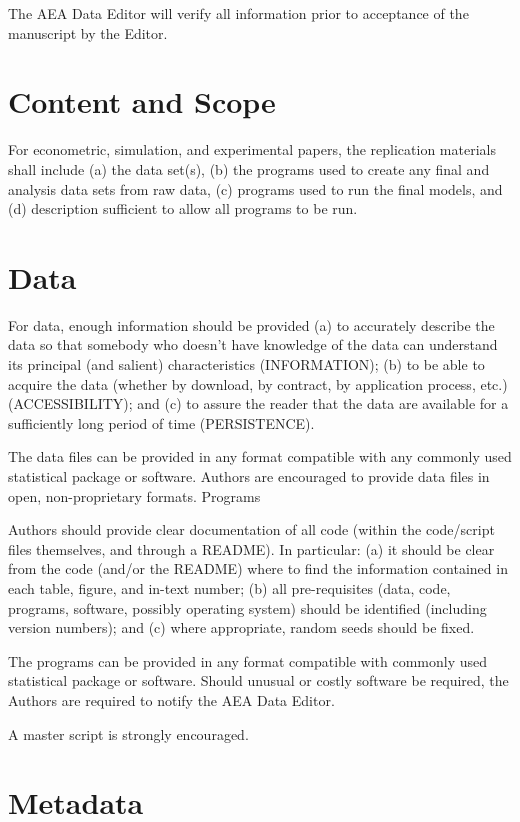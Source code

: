 \documentclass[PP]{AEA}
\begin{document}
The AEA Data Editor will verify all information prior to acceptance of the manuscript by the Editor.

\section{Content and Scope}

For econometric, simulation, and experimental papers, the replication materials shall include (a) the data set(s), (b) the programs used to create any final and analysis data sets from raw data, (c) programs used to run the final models, and (d) description sufficient to allow all programs to be run.

\section{Data}

For data, enough information should be provided (a) to accurately describe the data so that somebody who doesn’t have knowledge of the data can understand its principal (and salient)  characteristics (INFORMATION); (b) to be able to acquire the data (whether by download, by contract, by application process, etc.) (ACCESSIBILITY); and (c) to assure the reader that the data are available for a sufficiently long period of time (PERSISTENCE). 

The data files can be provided in any format compatible with any commonly used statistical package or software. Authors are encouraged to provide data files in open, non-proprietary formats.
Programs

Authors should provide clear documentation of all code (within the code/script files themselves, and through a README). In particular: (a) it should be clear from the code (and/or the README) where to find the information contained in each table, figure, and in-text number; (b) all pre-requisites (data, code, programs, software, possibly operating system) should be identified (including version numbers); and (c) where appropriate, random seeds should be fixed.

The programs can be provided in any format compatible with commonly used statistical package or software. Should unusual or costly software be required, the Authors are required to notify the AEA Data Editor.

A master script is strongly encouraged.

\section{Metadata}
\end{document}
